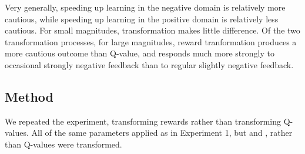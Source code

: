 Very generally, speeding up learning in the negative domain is relatively more cautious, while speeding up learning in the positive domain is relatively less cautious. For small magnitudes, transformation makes little difference. Of the two transformation processes, for large magnitudes, reward tranformation produces a more cautious outcome than Q-value, and responds much more strongly to occasional strongly negative feedback than to regular slightly negative feedback.








\subsection{Method}

We repeated the experiment, transforming rewards rather than transforming Q-values. All of the same parameters applied as in Experiment 1, but \RP{} and \RA{}, rather than Q-values were transformed.

